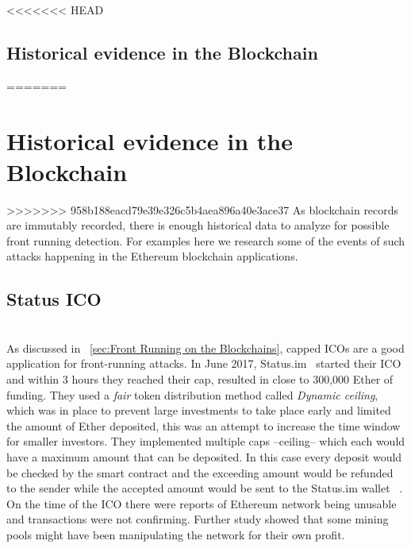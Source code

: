 
<<<<<<< HEAD
\subsection{Historical evidence in the Blockchain}  %

=======
\section{Historical evidence in the Blockchain}
>>>>>>> 958b188eacd79e39e326c5b4aea896a40e3ace37
As blockchain records are immutably recorded, there is enough historical data to analyze for possible front running detection. For examples here we research some of the events of such attacks happening in the Ethereum blockchain applications.



\subsection{Status ICO} \hfill\\ 
\noindent As discussed in ~\ref{sec:Front Running on the Blockchains}, capped ICOs are a good application for front-running attacks.  In June 2017, Status.im~\cite{statuswhitepaper} started their ICO and within 3 hours they reached their cap, resulted in close to 300,000 Ether of funding. They used a \textit{fair} token distribution method called \textit{Dynamic ceiling}, which was in place to prevent large investments to take place early and limited the amount of Ether deposited, this was an attempt to increase the time window for smaller investors. They implemented multiple caps --ceiling-- which each would have a maximum amount that can be deposited. In this case every deposit would be checked by the smart contract and the exceeding amount would be refunded to the sender while the accepted amount would be sent to the Status.im wallet ~\cite{statusicoanalysis}. 
On the time of the ICO there were reports of Ethereum network being unusable and transactions were not confirming. Further study showed that some mining pools might have been manipulating the network for their own profit.


